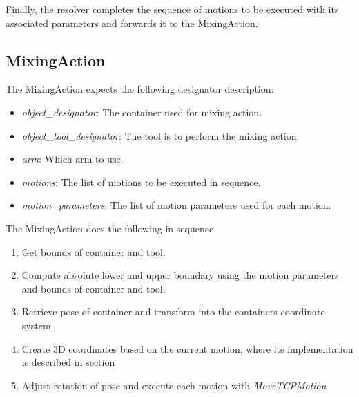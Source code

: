 Finally, the resolver completes the sequence of motions to be executed with its associated parameters and 
forwards it to the MixingAction.

\subsection{MixingAction}
The MixingAction expects the following designator description:
\begin{itemize}
    \item \textit{object\_designator}: The container used for mixing action.
    \item \textit{object\_tool\_designator}: The tool is to perform the mixing action.
    \item \textit{arm}: Which arm to use.
    \item \textit{motions}: The list of motions to be executed in sequence.
    \item \textit{motion\_parameters}: The list of motion parameters used for each motion.
\end{itemize}

The MixingAction does the following in sequence
\begin{enumerate}
    \item Get bounds of container and tool.
    \item Compute absolute lower and upper boundary using the motion parameters and bounds of container and tool.
    \item Retrieve pose of container and transform into the containers coordinate system.
    \item Create 3D coordinates based on the current motion, where its implementation is described in section 
    \item Adjust rotation of pose and execute each motion with \textit{MoveTCPMotion}
\end{enumerate}




